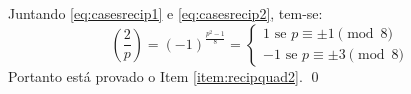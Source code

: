 Juntando \ref{eq:casesrecip1} e \ref{eq:casesrecip2}, tem-se:
 \begin{equation*}
    \left(\frac{2}{p} \right) = (-1)^{\frac{p^2 - 1}{8}} = \begin{cases}
            1 \text{ se $p \equiv \pm 1 \pmod{8}$}
            \\
            -1 \text{ se $p \equiv \pm 3 \pmod{8}$}
            \end{cases}
\end{equation*}
Portanto está provado o Item \ref{item:recipquad2}. \qed
